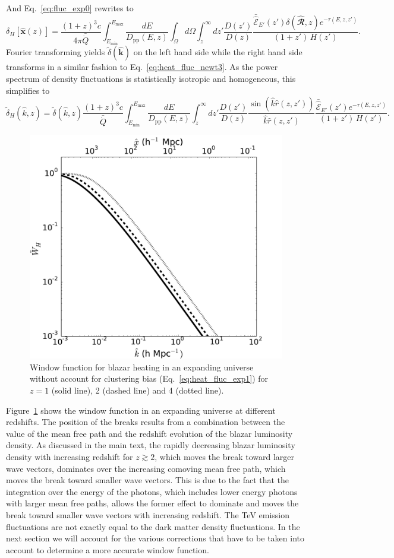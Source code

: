 \documentclass[numberedappendix]{emulateapj}
\newcommand{\calR}{\ensuremath{\bm\hat{\mathbfcal{R}}}}
\begin{document}
And Eq.~\eqref{eq:fluc_exp0} rewrites to
\begin{equation}
\label{eq:heat_fluc_exp0}
\delta_H[\mathbf{\hat{x}}(z)]=\frac{(1+z)^3  c}{4\pi\bar{\dot{Q}}}\int_{E_{\mathrm{min}}}^{E_{\mathrm{max}}} \frac{dE}{D_{\mathrm{pp}}(E,z)} \int_{\Omega}d\Omega\int_z^{\infty}dz' \frac{D(z')}{D(z)} \frac{\bar{\hat{\mathcal{E}}}_{E'}(z')\delta(\calR, z) e^{-\tau(E,z,z')}}{(1+z')\,H(z')}.
\end{equation}
Fourier transforming yields $\tilde{\delta}(\mathbf{\hat k})$ on the left hand side while the right hand side transforms in a similar fashion to Eq.~\eqref{eq:heat_fluc_newt3}. As the power spectrum of density fluctuations is statistically isotropic and homogeneous, this simplifies to
\begin{equation}
\label{eq:heat_fluc_exp1}
\tilde{\delta}_H(\hat k, z)=\tilde{\delta}(\hat k, z) \frac{(1+z)^3c}{\bar{\dot{Q}}} \int_{E_{\mathrm{min}}}^{E_{\mathrm{max}}} \frac{dE}{D_{\mathrm{pp}}(E,z)}\int_z^{\infty} dz' \frac{D(z')}{D(z)}\frac{\sin\left(\hat k\hat r(z,z')\right)}{\hat k \hat r(z, z')} \frac{\bar{\hat{\mathcal{E}}}_{E'}(z') e^{-\tau(E,z,z')}} {(1+z')\,H(z')}.
\end{equation}
\begin{figure}[h]
\centering
\includegraphics[width = .45\textwidth ]{window_nobias}
\caption{Window function for blazar heating in an expanding universe without account for clustering bias (Eq.~\eqref{eq:heat_fluc_exp1}) for $z=1$ (solid line), 2 (dashed line) and 4 (dotted line).}
\label{fig:window_nobiases}
\end{figure}
Figure~\ref{fig:window_nobiases} shows the window function in an expanding universe at different redshifts.  The position of the breaks results from a combination between the value of the mean free path and the redshift evolution of the blazar luminosity density. 
As discussed in the main text, the rapidly decreasing blazar luminosity density with increasing redshift for $z\gtrsim 2$, which moves the break toward larger wave vectors, dominates over the increasing comoving mean free path, which moves the break toward smaller wave vectors.  This is due to the fact that the integration over the energy of the photons, which includes lower energy photons with larger mean free paths, allows the former effect to dominate and moves the break toward smaller wave vectors with increasing redshift.
The TeV emission fluctuations are not exactly equal to the dark matter density fluctuations. In the next section we will account for the various corrections that have to be taken into account to determine a more accurate window function.
\end{document}
